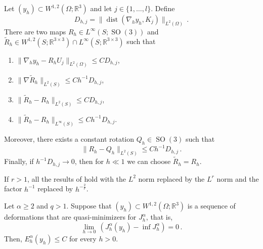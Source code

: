 \documentclass[10pt,a4paper]{amsart}
\DeclareMathOperator{\SO}{SO}
\DeclareMathOperator{\dist}{dist}
\renewcommand{\r}{\mathbb{R}}
\begin{document}
\begin{prop}\label{prop:approximated_rotation}
    Let $(y_h) \subset W^{1,2}(\Omega; \r^3)$ and let $j \in \{1, \dots, l\}$. Define
    \[
        D_{h, j} = \| \dist(\nabla_h y_h, K_j) \|_{L^2(\Omega)}\,.
    \]
    There are two maps $R_h \in L^\infty(S; \SO(3))$ and $\tilde R_h \in W^{1,2}(S; \r^{3 \times 3}) \cap L^\infty(S; \r^{3 \times 3})$ such that
    \begin{enumerate}[start=1,label={(R\arabic*)}]
        \item $\|\nabla_h y_h - R_h U_j\|_{L^2(\Omega)} \leq C D_{h, j}$\label{item:approximated_rotation_convergence_scaled_gradient},
        \item $\|\nabla \tilde R_h\|_{L^2(S)} \leq C h^{-1}D_{h, j}$\label{item:approximated_rotation_convergence_gradient},
        \item $\|\tilde R_h - R_h\|_{L^2(S)} \leq C D_{h, j}$,
        \item $\|\tilde R_h - R_h\|_{L^\infty(S)} \leq C h^{-1}D_{h, j}$.
    \end{enumerate}
    Moreover, there exists a constant rotation $Q_h \in \SO(3)$ such that
    \begin{equation}
        \|R_h - Q_h\|_{L^2(S)} \leq Ch^{-1}D_{h, j} \,.\label{eq:approximated_constant_rotation}
    \end{equation}
    Finally, if $h^{-1}D_{h, j} \to 0$, then for $h \ll 1$ we can choose $\tilde R_h = R_h$.
\end{prop}

\begin{remark}\label{remark:approximated_rotation_Lr}
	If $ r > 1 $, all the results of  hold with the $L^2$ norm replaced by the $L^r$ norm and the factor $h^{-1}$ replaced by $h^{-\frac{2}{r}}$.
\end{remark}

\begin{lemma}\label{lemma:compactness_forces}
	Let $\alpha \geq 2$ and $q > 1$. Suppose that $(y_h) \subset W^{1,2}(\Omega; \r^3)$ is a sequence of deformations that are quasi-minimizers for $J_h^\alpha$, that is,
	\[
	\lim_{h \to 0} \, (J_h^\alpha(y_h) - \inf J_h^\alpha) =0 \,.
	\]
	Then, $E_h^\alpha(y_h) \leq C$ for every $h > 0$.
\end{lemma}
\end{document}
